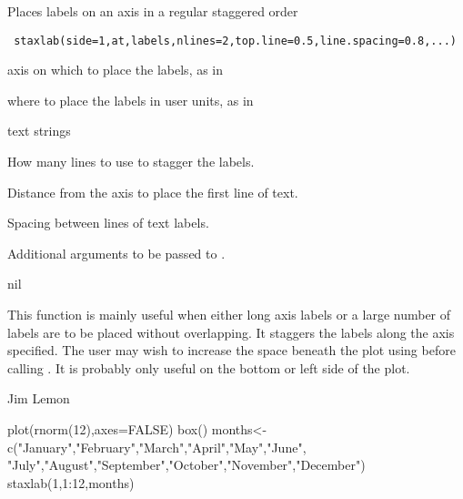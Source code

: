 \begin{Description}\relax
Places labels on an axis in a regular staggered order
\end{Description}
\begin{Usage}
\begin{verbatim}
 staxlab(side=1,at,labels,nlines=2,top.line=0.5,line.spacing=0.8,...)
\end{verbatim}
\end{Usage}
\begin{Arguments}
\begin{ldescription}
\item[\code{side}] axis on which to place the labels, as in 
\item[\code{at}] where to place the labels in user units, as in 
\item[\code{labels}] text strings
\item[\code{nlines}] How many lines to use to stagger the labels.
\item[\code{top.line}] Distance from the axis to place the first line of text.
\item[\code{line.spacing}] Spacing between lines of text labels.
\item[\code{...}] Additional arguments to be passed to .
\end{ldescription}
\end{Arguments}
\begin{Value}
nil
\end{Value}
\begin{Note}\relax
This function is mainly useful when either long axis labels or a large
number of labels are to be placed without overlapping. It staggers the 
labels along the axis specified. The user may wish to increase the space
beneath the plot using  before calling . It is
probably only useful on the bottom or left side of the plot.
\end{Note}
\begin{Author}\relax
Jim Lemon
\end{Author}
\begin{SeeAlso}\relax
{}
\end{SeeAlso}
\begin{Examples}
\begin{ExampleCode}
 plot(rnorm(12),axes=FALSE)
 box()
 months<-c("January","February","March","April","May","June",
  "July","August","September","October","November","December")
 staxlab(1,1:12,months)
\end{ExampleCode}
\end{Examples}

